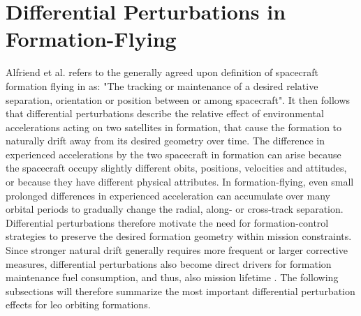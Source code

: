 \section{Differential Perturbations in Formation-Flying}
\label{sec:diff_perturb}
Alfriend et al. refers to the generally agreed upon definition of spacecraft formation flying in \cite{alfriend2010} as: "The tracking or maintenance of a desired relative separation, orientation or position between or among spacecraft". It then follows that differential perturbations describe the relative effect of environmental accelerations acting on two satellites in formation, that cause the formation to naturally drift away from its desired geometry over time. The difference in experienced accelerations by the two spacecraft in formation can arise because the spacecraft occupy slightly different obits, positions, velocities and attitudes, or because they have different physical attributes. In formation-flying, even small prolonged differences in experienced acceleration can accumulate over many orbital periods to gradually change the radial, along- or cross-track separation. Differential perturbations therefore motivate the need for formation-control strategies to preserve the desired formation geometry within mission constraints. Since stronger natural drift generally requires more frequent or larger corrective measures, differential perturbations also become direct drivers for formation maintenance fuel consumption, and thus, also mission lifetime \cite{montenbruck2000, alfriend2010}. The following subsections will therefore summarize the most important differential perturbation effects for \gls{leo} orbiting formations.

